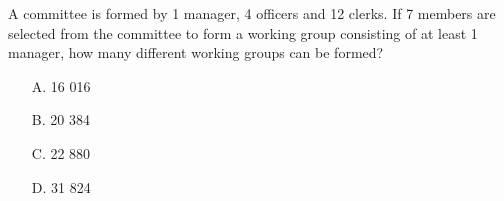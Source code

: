 
A committee is formed by 1 manager, 4 officers and 12 clerks. If 7 members are selected from the committee to form a working group consisting of at least 1 manager, how many different working groups can be formed?
    \begin{itemize}
        \item[A.] 16 016
        \item[B.] 20 384
        \item[C.] 22 880
        \item[D.] 31 824
    \end{itemize}



